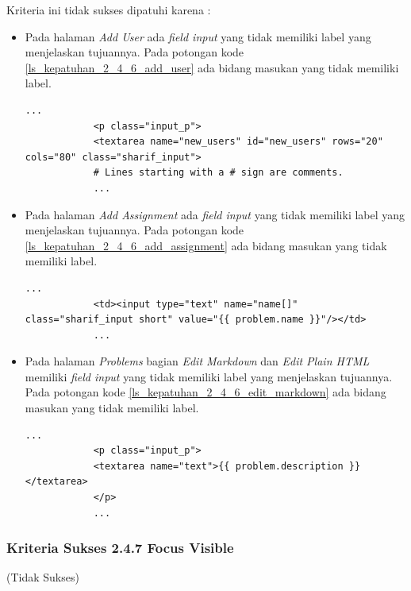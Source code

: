 \documentclass[a4paper,twoside]{article}
\begin{document}
\begin{enumerate}
		Kriteria ini tidak sukses dipatuhi karena :
		\begin{itemize}
			\item Pada halaman \textit{Add User} ada \textit{field input} yang tidak memiliki label yang menjelaskan tujuannya. Pada potongan kode \ref{ls_kepatuhan_2_4_6_add_user} ada bidang masukan yang tidak memiliki label.
			\begin{lstlisting}[basicstyle=\ttfamily, frame=single,
			columns=fullflexible, keepspaces=true, breaklines=true, label=ls_kepatuhan_2_4_6_add_user, caption=Kriteria Sukses 2.4.6 - Halaman \textit{Add User}]
			...
			<p class="input_p">
			<textarea name="new_users" id="new_users" rows="20" cols="80" class="sharif_input">
			# Lines starting with a # sign are comments.
			...
			\end{lstlisting}
			
			\item Pada halaman \textit{Add Assignment} ada \textit{field input} yang tidak memiliki label yang menjelaskan tujuannya. Pada potongan kode \ref{ls_kepatuhan_2_4_6_add_assignment} ada bidang masukan yang tidak memiliki label.
			\begin{lstlisting}[basicstyle=\ttfamily, frame=single,
			columns=fullflexible, keepspaces=true, breaklines=true, label=ls_kepatuhan_2_4_6_add_assignment, caption=Kriteria Sukses 2.4.6 - Halaman \textit{Add Assignment}]
			...
			<td><input type="text" name="name[]" class="sharif_input short" value="{{ problem.name }}"/></td>
			...
			\end{lstlisting}
			
			\item Pada halaman \textit{Problems} bagian \textit{Edit Markdown} dan \textit{Edit Plain HTML} memiliki \textit{field input} yang tidak memiliki label yang menjelaskan tujuannya. Pada potongan kode \ref{ls_kepatuhan_2_4_6_edit_markdown} ada bidang masukan yang tidak memiliki label.
			\begin{lstlisting}[basicstyle=\ttfamily, frame=single,
			columns=fullflexible, keepspaces=true, breaklines=true, label=ls_kepatuhan_2_4_6_edit_markdown, caption=Kriteria Sukses 2.4.6 - Halaman \textit{Problems} bagian \textit{Edit Markdown}]
			...
			<p class="input_p">
			<textarea name="text">{{ problem.description }}</textarea>
			</p>
			...
			\end{lstlisting}
			
		\end{itemize}
		
		\subsubsection*{Kriteria Sukses 2.4.7 Focus Visible}
		\label{subsubsec:kepatuhan_kriteria_2.4.7}
		(Tidak Sukses) \\
		

\end{enumerate}
\end{document}
